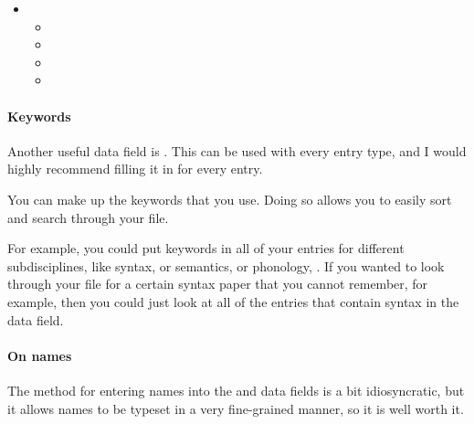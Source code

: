 \begin{multicols}{3}
\begin{itemize}
{\begin{itemize}
			\item{}

		\end{itemize}

	}

	\item{

		\begin{itemize}

			\item{}

			\item{}

			\item{}

			\item{}

		\end{itemize}

	}

\end{itemize}
\end{multicols}

\paragraph{Keywords}

Another useful data field is .
This can be used with every entry type, and I would highly recommend filling it in for every entry.

You can make up the keywords that you use.
Doing so allows you to easily sort and search through your  file.

For example, you could put keywords in all of your entries for different subdisciplines, like syntax, or semantics, or phonology, \ETC.
If you wanted to look through your  file for a certain syntax paper that you cannot remember, for example, then you could just look at all of the entries that contain syntax in the  data field.

\paragraph{On names}

The method for entering names into the  and  data fields is a bit idiosyncratic, but it allows names to be typeset in a very fine-grained manner, so it is well worth it.

